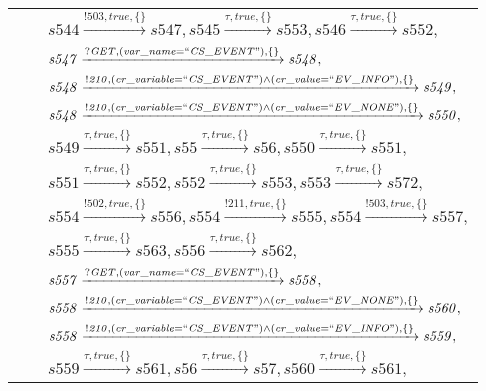 \begin{tabular}{lcl}
& & $\mathit{s544}\xrightarrow{\mathit{!503}, \mathit{true}, \{\}}\mathit{s547},\mathit{s545}\xrightarrow{\mathit{\tau}, \mathit{true}, \{\}}\mathit{s553},\mathit{s546}\xrightarrow{\mathit{\tau}, \mathit{true}, \{\}}\mathit{s552},$ \\
& & $\mathit{s547}\xrightarrow{\mathit{?GET}, \mathit{(var\_name = ``CS\_EVENT")}, \{\}}\mathit{s548},$ \\
& & $\mathit{s548}\xrightarrow{\mathit{!210}, \mathit{(cr\_variable = ``CS\_EVENT") \land (cr\_value = ``EV\_INFO")}, \{\}}\mathit{s549},$ \\
& & $\mathit{s548}\xrightarrow{\mathit{!210}, \mathit{(cr\_variable = ``CS\_EVENT") \land (cr\_value = ``EV\_NONE")}, \{\}}\mathit{s550},$ \\
& & $\mathit{s549}\xrightarrow{\mathit{\tau}, \mathit{true}, \{\}}\mathit{s551},\mathit{s55}\xrightarrow{\mathit{\tau}, \mathit{true}, \{\}}\mathit{s56},\mathit{s550}\xrightarrow{\mathit{\tau}, \mathit{true}, \{\}}\mathit{s551},$ \\
& & $\mathit{s551}\xrightarrow{\mathit{\tau}, \mathit{true}, \{\}}\mathit{s552},\mathit{s552}\xrightarrow{\mathit{\tau}, \mathit{true}, \{\}}\mathit{s553},\mathit{s553}\xrightarrow{\mathit{\tau}, \mathit{true}, \{\}}\mathit{s572},$ \\
& & $\mathit{s554}\xrightarrow{\mathit{!502}, \mathit{true}, \{\}}\mathit{s556},\mathit{s554}\xrightarrow{\mathit{!211}, \mathit{true}, \{\}}\mathit{s555},\mathit{s554}\xrightarrow{\mathit{!503}, \mathit{true}, \{\}}\mathit{s557},$ \\
& & $\mathit{s555}\xrightarrow{\mathit{\tau}, \mathit{true}, \{\}}\mathit{s563},\mathit{s556}\xrightarrow{\mathit{\tau}, \mathit{true}, \{\}}\mathit{s562},$ \\
& & $\mathit{s557}\xrightarrow{\mathit{?GET}, \mathit{(var\_name = ``CS\_EVENT")}, \{\}}\mathit{s558},$ \\
& & $\mathit{s558}\xrightarrow{\mathit{!210}, \mathit{(cr\_variable = ``CS\_EVENT") \land (cr\_value = ``EV\_NONE")}, \{\}}\mathit{s560},$ \\
& & $\mathit{s558}\xrightarrow{\mathit{!210}, \mathit{(cr\_variable = ``CS\_EVENT") \land (cr\_value = ``EV\_INFO")}, \{\}}\mathit{s559},$ \\
& & $\mathit{s559}\xrightarrow{\mathit{\tau}, \mathit{true}, \{\}}\mathit{s561},\mathit{s56}\xrightarrow{\mathit{\tau}, \mathit{true}, \{\}}\mathit{s57},\mathit{s560}\xrightarrow{\mathit{\tau}, \mathit{true}, \{\}}\mathit{s561},$ \\
\end{tabular}

